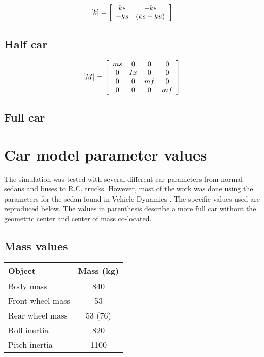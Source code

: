 \begin{equation} \label{eq:quarter_car_k}
	[k] = \left[
		\begin{array}{c c}
		ks & -ks \\
		-ks & (ks+ku) \\
		\end{array}
	\right]
\end{equation}

\subsection{Half car}
\begin{equation} \label{eq:half_car_m}
	[M] = \left[
		\begin{array}{c c c c}
		ms & 0 & 0 & 0 \\
		0 & Ix & 0 & 0 \\
		0 & 0 & mf & 0 \\
		0 & 0 & 0 & mf \\
		\end{array}
	\right]
\end{equation}





\subsection{Full car}



\section{Car model parameter values}
The simulation was tested with several different car parameters from normal sedans and buses to R.C. trucks. However, most of the work was done using the parameters for the sedan found in Vehicle Dynamics \cite{book:jazar}. The specific values used are reproduced below. The values in parenthesis describe a more full car without the geometric center and center of mass co-located.

\subsection{Mass values}
\begin{center}
\begin{tabular}{| l | c |}
\hline
Object & Mass (kg) \\
\hline
Body mass & 840 \\
Front wheel mass & 53 \\
Rear wheel mass & 53 (76) \\
Roll inertia & 820 \\
Pitch inertia & 1100 \\
\hline
\end{tabular}
\end{center}


